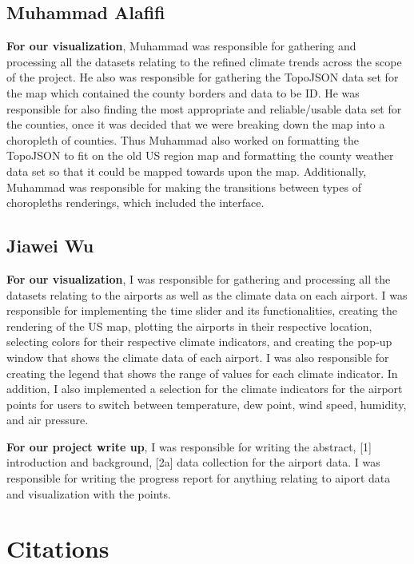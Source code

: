 \documentclass[9pt,twocolumn,twoside]{opticajnl}
\begin{document}
\subsection {Muhammad Alafifi}
\textbf{For our visualization}, Muhammad was responsible for gathering and processing all the datasets relating to the refined climate trends across the scope of the project. He also was responsible for gathering the TopoJSON data set for the map which contained the county borders and data to be ID. He was responsible for also finding the most appropriate and reliable/usable data set for the counties, once it was decided that we were breaking down the map into a choropleth of counties. Thus Muhammad also worked on formatting the TopoJSON to fit on the old US region map and formatting the county weather data set so that it could be mapped towards upon the map. Additionally, Muhammad was responsible for making the transitions between types of choropleths renderings, which included the interface.

\subsection {Jiawei Wu}

\textbf{For our visualization}, I was responsible for gathering and processing all the datasets relating to the airports as well as the climate data on each airport. I was responsible for implementing the time slider and its functionalities, creating the rendering of the US map, plotting the airports in their respective location, selecting colors for their respective climate indicators, and creating the pop-up window that shows the climate data of each airport. I was also responsible for creating the legend that shows the range of values for each climate indicator. In addition, I also implemented a selection for the climate indicators for the airport points for users to switch between temperature, dew point, wind speed, humidity, and air pressure.

\textbf{For our project write up}, I was responsible for writing the abstract, [1] introduction and background, [2a] data collection for the airport data. I was responsible for writing the progress report for anything relating to aiport data and visualization with the points.

\section {Citations}
\end{document}
